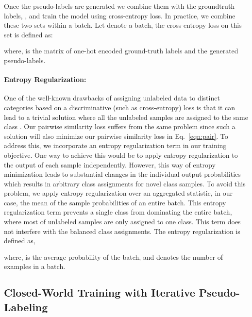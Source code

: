 \documentclass[runningheads]{eccv2022submission}
\begin{document}
Once the pseudo-labels are generated we combine them with the groundtruth labels, , and train the model using cross-entropy loss. In practice, we combine these two sets within a batch. Let  denote a batch, the cross-entropy loss on this set is defined as:

\setlength{\abovedisplayskip}{-8pt}
\setlength{\belowdisplayskip}{2pt}
\setlength{\abovedisplayshortskip}{0pt}
\setlength{\belowdisplayshortskip}{0pt}

where,  is the matrix of one-hot encoded ground-truth labels and the generated pseudo-labels.  


\vspace{-4mm}
\paragraph{\textbf{Entropy Regularization:}}
\label{par:entropy}
One of the well-known drawbacks of assigning unlabeled data to distinct categories based on a discriminative (such as cross-entropy) loss is that it can lead to a trivial solution where all the unlabeled samples are assigned to the same class \cite{YM.2020Self-labelling,caron2018deep,cao2022openworld,fini2021unified}. Our pairwise similarity loss suffers from the same problem since such a solution will also minimize our pairwise similarity loss in Eq.~\ref{eqn:pair}. To address this, we incorporate an entropy regularization term in our training objective. One way to achieve this would be to apply entropy regularization to the output of each sample independently. However, this way of entropy minimization leads to substantial changes in the individual output probabilities which results in arbitrary class assignments for novel class samples. To avoid this problem, we apply entropy regularization over an aggregated statistic, in our case, the mean of the sample probabilities of an entire batch. This entropy regularization term prevents a single class from dominating the entire batch, where most of unlabeled samples are only assigned to one class. This term does not interfere with the balanced class assignments. 
The entropy regularization is defined as, 


where,  is the average probability of the batch, and  denotes the number of examples in a batch.




\vspace{-2mm}
\subsection{Closed-World Training with Iterative Pseudo-Labeling}
\label{sec:ipl}
\vspace{-2mm}
 
\end{document}
